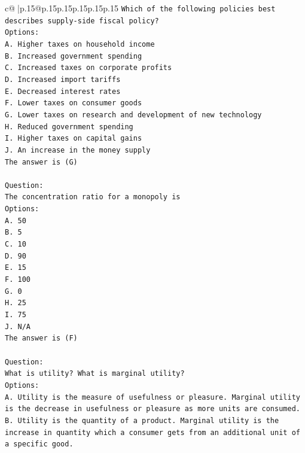 \documentclass{article}
\begin{document}
{\begin{supertabular}{c@{$\;$}|p{.15\linewidth}@{}p{.15\linewidth}p{.15\linewidth}p{.15\linewidth}p{.15\linewidth}p{.15\linewidth}}
{{{\texttt{Which of the following policies best describes supply{-}side fiscal policy?} \\
\texttt{Options:} \\
\texttt{A. Higher taxes on household income} \\
\texttt{B. Increased government spending} \\
\texttt{C. Increased taxes on corporate profits} \\
\texttt{D. Increased import tariffs} \\
\texttt{E. Decreased interest rates} \\
\texttt{F. Lower taxes on consumer goods} \\
\texttt{G. Lower taxes on research and development of new technology} \\
\texttt{H. Reduced government spending} \\
\texttt{I. Higher taxes on capital gains} \\
\texttt{J. An increase in the money supply} \\
\texttt{The answer is (G)} \\
\\ 
\texttt{Question:} \\
\texttt{The concentration ratio for a monopoly is} \\
\texttt{Options:} \\
\texttt{A. 50} \\
\texttt{B. 5} \\
\texttt{C. 10} \\
\texttt{D. 90} \\
\texttt{E. 15} \\
\texttt{F. 100} \\
\texttt{G. 0} \\
\texttt{H. 25} \\
\texttt{I. 75} \\
\texttt{J. N/A} \\
\texttt{The answer is (F)} \\
\\ 
\texttt{Question:} \\
\texttt{What is utility? What is marginal utility?} \\
\texttt{Options:} \\
\texttt{A. Utility is the measure of usefulness or pleasure. Marginal utility is the decrease in usefulness or pleasure as more units are consumed.} \\
\texttt{B. Utility is the quantity of a product. Marginal utility is the increase in quantity which a consumer gets from an additional unit of a specific good.} \\
}}}
\end{supertabular}}
\end{document}
